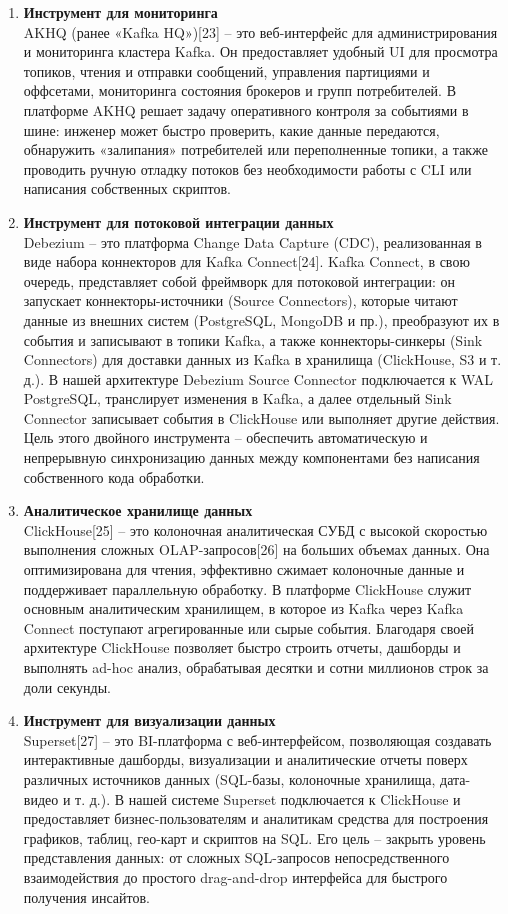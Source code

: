 \begin{enumerate}[1.]
	\item \textbf{Инструмент для мониторинга}\\
	      AKHQ (ранее «Kafka HQ»)[23] – это веб-интерфейс для администрирования и мониторинга кластера Kafka. Он предоставляет удобный UI для просмотра топиков, чтения и отправки сообщений, управления партициями и оффсетами, мониторинга состояния брокеров и групп потребителей. В платформе AKHQ решает задачу оперативного контроля за событиями в шине: инженер может быстро проверить, какие данные передаются, обнаружить «залипания» потребителей или переполненные топики, а также проводить ручную отладку потоков без необходимости работы с CLI или написания собственных скриптов.
	\item \textbf{Инструмент для потоковой интеграции данных}\\
	      Debezium – это платформа Change Data Capture (CDC), реализованная в виде набора коннекторов для Kafka Connect[24]. Kafka Connect, в свою очередь, представляет собой фреймворк для потоковой интеграции: он запускает коннекторы-источники (Source Connectors), которые читают данные из внешних систем (PostgreSQL, MongoDB и пр.), преобразуют их в события и записывают в топики Kafka, а также коннекторы-синкеры (Sink Connectors) для доставки данных из Kafka в хранилища (ClickHouse, S3 и т. д.). В нашей архитектуре Debezium Source Connector подключается к WAL PostgreSQL, транслирует изменения в Kafka, а далее отдельный Sink Connector записывает события в ClickHouse или выполняет другие действия. Цель этого двойного инструмента – обеспечить автоматическую и непрерывную синхронизацию данных между компонентами без написания собственного кода обработки.
	\item \textbf{Аналитическое хранилище данных}\\
	      ClickHouse[25] – это колоночная аналитическая СУБД с высокой скоростью выполнения сложных OLAP-запросов[26] на больших объемах данных. Она оптимизирована для чтения, эффективно сжимает колоночные данные и поддерживает параллельную обработку. В платформе ClickHouse служит основным аналитическим хранилищем, в которое из Kafka через Kafka Connect поступают агрегированные или сырые события. Благодаря своей архитектуре ClickHouse позволяет быстро строить отчеты, дашборды и выполнять ad-hoc анализ, обрабатывая десятки и сотни миллионов строк за доли секунды.
	\item \textbf{Инструмент для визуализации данных}\\
	      Superset[27] – это BI-платформа с веб-интерфейсом, позволяющая создавать интерактивные дашборды, визуализации и аналитические отчеты поверх различных источников данных (SQL-базы, колоночные хранилища, дата-видео и т. д.). В нашей системе Superset подключается к ClickHouse и предоставляет бизнес-пользователям и аналитикам средства для построения графиков, таблиц, гео-карт и скриптов на SQL. Его цель – закрыть уровень представления данных: от сложных SQL-запросов непосредственного взаимодействия до простого drag-and-drop интерфейса для быстрого получения инсайтов.
\end{enumerate}


